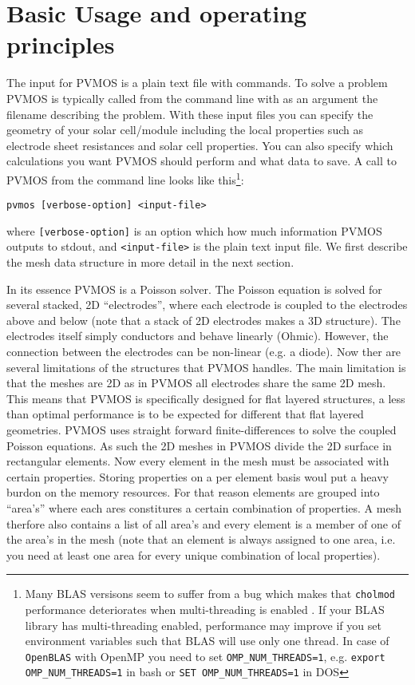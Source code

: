 \documentclass[noshowpacs,preprintnumbers,amsmath,amssymb, letter]{revtex4}
\begin{document}
\section{Basic Usage and operating principles}
The input for PVMOS is a plain text file with commands. To solve a problem PVMOS is typically called from the command line with as an argument the filename describing the problem. With these input files you can specify the geometry of your solar cell/module including the local properties such as electrode sheet resistances and solar cell properties. You can also specify which calculations you want PVMOS should perform and what data to save. A call to PVMOS from the command line looks like this\footnote{Many BLAS versisons seem to suffer from a bug which makes that \texttt{cholmod} performance deteriorates when multi-threading is enabled \cite{Davis:2007:Online}. If your BLAS library has multi-threading enabled, performance may improve if you set environment variables such that BLAS will use only one thread. In case of \texttt{OpenBLAS} with OpenMP you need to set \texttt{OMP\_NUM\_THREADS=1}, e.g. \texttt{export OMP\_NUM\_THREADS=1} in bash or \texttt{SET OMP\_NUM\_THREADS=1} in DOS}:
\begin{verbatim}
pvmos [verbose-option] <input-file>
\end{verbatim}
where \texttt{[verbose-option]} is an option which how much information PVMOS outputs to stdout, and \texttt{<input-file>} is the plain text input file. We first describe the mesh data structure in more detail in the next section. 

In its essence PVMOS is a Poisson solver. The Poisson equation is solved for several stacked, 2D ``electrodes'', where each electrode is coupled to the electrodes above and below (note that a stack of 2D electrodes makes a 3D structure). The electrodes itself simply conductors and behave linearly (Ohmic). However, the connection between the electrodes can be non-linear (e.g. a diode). Now ther are several limitations of the structures that PVMOS handles. The main limitation is that the meshes are 2D as in PVMOS all electrodes share the same 2D mesh. This means that PVMOS is specifically designed for flat layered structures, a less than optimal performance is to be expected for different that flat layered geometries. PVMOS uses straight forward finite-differences to solve the coupled Poisson equations. As such the 2D meshes in PVMOS divide the 2D surface in rectangular elements. Now every element in the mesh must be associated with certain properties. Storing properties on a per element basis woul put a heavy burdon on the memory resources. For that reason elements are grouped into ``area's'' where each ares constitures a certain combination of properties. A mesh therfore also contains a list of all area's and every element is a member of one of the area's in the mesh (note that an element is always assigned to one area, i.e. you need at least one area for every unique combination of local properties).
\end{document}

